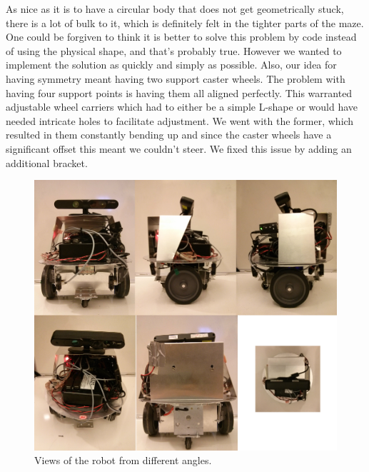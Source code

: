\documentclass[10pt,a4paper,twocolumn]{article}
\begin{document}
As nice as it is to have a circular body that does not get geometrically stuck,
there is a lot of bulk to it, which is definitely felt in the tighter parts of
the maze. One could be forgiven to think it is better to solve this problem by
code instead of using the physical shape, and that’s probably true. However we
wanted to implement the solution as quickly and simply as possible. Also, our
idea for having symmetry meant having two support caster wheels. The problem
with having four support points is having them all aligned perfectly. This
warranted adjustable wheel carriers which had to either be a simple L-shape or
would have needed intricate holes to facilitate adjustment. We went with the
former, which resulted in them constantly bending up and since the caster wheels
have a significant offset this meant we couldn't steer. We fixed this issue by
adding an additional bracket.
\begin{figure}
  \centering
  \includegraphics[width=\linewidth]{images/robo_views.png}
  \caption{Views of the robot from different angles.}
  \label{fig:roboview}
\end{figure}
\end{document}
